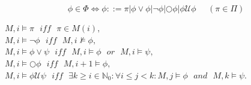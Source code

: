 \documentclass[handout]{beamer}
\begin{document}
\section{}

\begin{frame}{}
\begin{flushright}
	\begin{block}{}
		\vspace{-0.75 cm}
		\begin{center}
		$$
		\phi \in \Phi \Leftrightarrow
		\phi ::= \pi | \phi \lor \phi |
		\neg \phi |
		\bigcirc \phi |
		\phi \mathcal{U}\phi \;\;\;\;\;(\pi \in \Pi) 
		$$	
		\end{center}
	\end{block}	
\pause
	\begin{block}{}
		\vspace{-0.5 cm}
		\begin{center}
		$	M,i \models \pi \:\:\: \mathit{iff} \:\:\: \pi \in M(i),$\\
		$	M,i \models \neg \phi \:\:\: \mathit{iff} \:\:\: M,i\nvDash \phi,$\\
		$	M,i \models \phi \lor \psi \:\:\: \mathit{iff} \:\:\: M,i \models \phi \:\:\: \mathit{or} \:\:\: M,i \models \psi,$\\
		$M,i \models \bigcirc \phi  \:\:\:  \mathit{iff} \:\:\: M,i+1 \models \phi,$\\
		$M,i \models \phi \mathcal{U} \psi \:\:\: \mathit{iff} \:\:\: 
		\exists k \geq i \in \mathbb{N}_0: \forall i\leq j< k: M,j \models \phi \:\:\: \mathit{and} \:\:\: M,k \models \psi.$
		\end{center}	
\end{block}
\end{flushright}
\end{frame}
\end{document}
